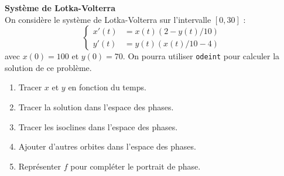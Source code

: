 \documentclass[12pt]{article}
\begin{document}
\begin{exo}\textbf{Syst\`eme de Lotka-Volterra}\\
On consid\`ere le syst\`eme de Lotka-Volterra sur l'intervalle $[0,30]$ :
$$
\left\{
\begin{array}{rl}
x'(t)&=x(t)(2-y(t)/10)\\
y'(t)&=y(t)(x(t)/10-4)
\end{array}
\right.
$$
avec %
$x(0)=100$ et $y(0)=70$.
On pourra utiliser \texttt{odeint} pour calculer la solution de ce probl\`eme.
\begin{enumerate}
\item Tracer $x$ et $y$ en fonction du temps.
\item Tracer la solution dans l'espace des phases.
\item Tracer les isoclines dans l'espace des phases. 
\item Ajouter d'autres orbites dans l'espace des phases.
\item Repr\'esenter $f$ pour compl\'eter le portrait de phase.
\end{enumerate}
\end{exo}
\end{document}
